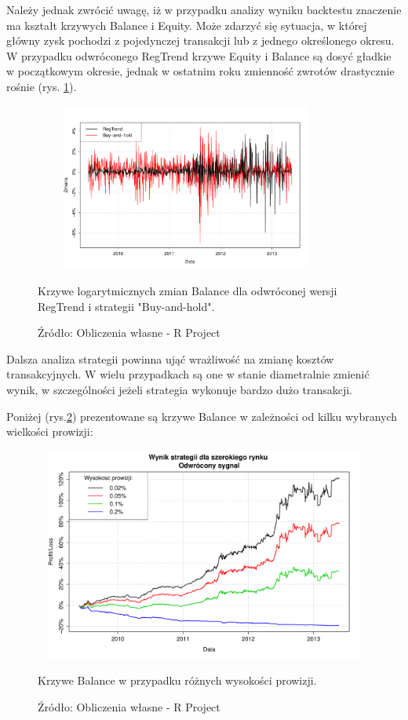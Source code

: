 \documentclass[man,mfu]{mgrwms}
\begin{document}
Należy jednak zwrócić uwagę, iż w przypadku analizy wyniku backtestu znaczenie ma kształt krzywych Balance i Equity. Może zdarzyć się sytuacja, w której główny zysk pochodzi z pojedynczej transakcji lub z jednego określonego okresu. W przypadku odwróconego RegTrend krzywe Equity i Balance są dosyć gładkie w początkowym okresie, jednak w ostatnim roku zmienność zwrotów drastycznie rośnie (rys. \ref{fig:volchange}).
\begin{figure}[H]
\centering
\vspace{-10pt}
\includegraphics[width=100mm,height = 55mm]{volchange}
\vspace{-10pt}
\caption{Krzywe logarytmicznych zmian Balance dla odwróconej wersji RegTrend i strategii "Buy-and-hold".}\vspace{-10pt}
\caption*{Źródło: Obliczenia własne - R Project}
\label{fig:volchange}\vspace{-10pt}
\end{figure}


Dalsza analiza strategii powinna ująć wrażliwość na zmianę kosztów transakcyjnych. W wielu przypadkach są one w stanie diametralnie zmienić wynik, w szczególności jeżeli strategia wykonuje bardzo dużo transakcji. %

Poniżej (rys.\ref{fig:commission}) prezentowane są krzywe Balance w zależności od kilku wybranych wielkości prowizji:
\begin{figure}[H]
\centering
\vspace{-10pt}
\includegraphics[width=120mm,height = 70mm]{commission}
\vspace{-10pt}
\caption{Krzywe Balance w przypadku różnych wysokości prowizji.}
\caption*{Źródło: Obliczenia własne - R Project}
\label{fig:commission}
\end{figure}
\end{document}
